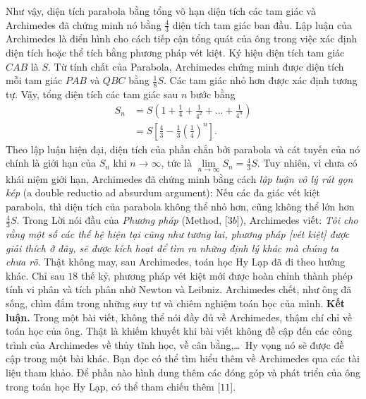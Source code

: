 \begin{multicols}{2}
\begin{figure}[H]
		\vspace*{-15pt}
	\end{figure}
	Như vậy, diện tích parabola bằng tổng vô hạn diện tích các tam giác và Archimedes đã chứng minh nó bằng $\frac{4}{3}$  diện tích tam giác ban đầu.   
	\vskip 0.1cm
	Lập luận của Archimedes là điển hình cho cách tiếp cận tổng quát của ông trong việc xác định diện tích hoặc thể tích bằng phương pháp vét kiệt.  Ký hiệu diện tích tam giác $CAB$ là $S$.  Từ tính chất của Parabola, Archimedes chứng minh được diện tích mỗi tam giác $PAB$  và $QBC$  bằng $\frac{1}{8}S$.  Các tam giác nhỏ hơn được xác định tương tự. Vậy, tổng diện tích các tam giác sau $n$  bước bằng
	\begin{align*}
		{S_n} &= S\left( {1 + \frac{1}{4} + \frac{1}{{{4^2}}} + ... + \frac{1}{{{4^n}}}} \right) \\
		&= S\left[ {\frac{4}{3} - \frac{1}{3}{{\left( {\frac{1}{4}} \right)}^n}} \right].
	\end{align*}
	Theo lập luận hiện đại, diện tích của phần chắn bởi parabola và cát tuyến của nó chính là giới hạn của $S_n$  khi $n \to \infty$,  tức là  $\mathop {\lim }\limits_{n \to \infty } {S_n} = \frac{4}{3}S.$
	\vskip 0.1cm
	Tuy nhiên, vì chưa có khái niệm giới hạn, Archimedes đã chứng minh bằng cách \textit{lập luận vô lý rút gọn kép} (a double reductio ad absurdum argument): Nếu các đa giác vét kiệt parabola, thì diện tích của parabola không thể nhỏ hơn, cũng không thể lớn hơn $\frac{4}{3}S.$
	\vskip 0.1cm  
	Trong Lời nói đầu của \textit{Phương pháp} (Method, [$3b$]), Archimedes viết: \textit{Tôi cho rằng một số các thế hệ hiện tại cũng như tương lai, phương pháp [vét kiệt] được giải thích ở đây, sẽ được kích hoạt để tìm ra những định lý khác mà chúng ta chưa rõ}. Thật không may, sau Archimedes, toán học Hy Lạp đã đi theo hướng khác.  Chỉ sau $18$ thế kỷ, phương pháp vét kiệt mới được hoàn chỉnh thành phép tính vi phân và tích phân nhờ Newton và Leibniz. 
	\vskip 0.1cm
	Archimedes chết, như ông đã sống, chìm đắm trong những suy tư và chiêm nghiệm toán học của mình. 
	\vskip 0.1cm
	\textbf{\color{lichsutoanhoc}Kết luận.} Trong một bài viết, không thể nói đầy đủ về Archimedes, thậm chí chỉ về toán học của ông. Thật là khiếm khuyết khi bài viết không đề cập đến các công trình của Archimedes về thủy tĩnh học, về cân bằng,\ldots\, Hy vọng nó sẽ được đề cập trong một bài khác. 
	\vskip 0.1cm
	Bạn đọc có thể tìm hiểu thêm về Archimedes qua các tài liệu tham khảo. Để phần nào hình dung thêm các đóng góp và phát triển của ông trong toán học Hy Lạp, có thể tham chiếu thêm [$11$].

\end{multicols}
